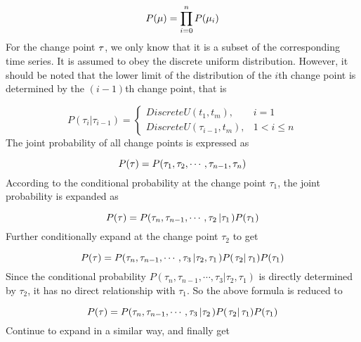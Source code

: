 \documentclass{svjour3}                     %
\begin{document}
\begin{equation}\label{eq_bayesian_prior_mu_sum}
P({\bf{\mu }}) = \prod\limits_{i = 0}^n {P({\mu _i})}
\end{equation}
For the change point ${\bf{\tau }}$, we only know that it is a subset of the corresponding time series.
It is assumed to obey the discrete uniform distribution. However, it should be noted that the lower limit of the distribution of the $i$th change point is determined by the $(i-1)$th change point, that is

\begin{equation}\label{eq_bayesian_prior_tau_basic}
P({\tau _i}\left| {{\tau _{i - 1}}} \right.) = \left\{ {\begin{array}{*{20}{r}}
	{DiscreteU({t_1},{t_m}),}&{i = 1}\\
	{DiscreteU({\tau _{i - 1}},{t_m}),}&{1 < i \le n}
	\end{array}} \right.
\end{equation}
The joint probability of all change points is expressed as

\begin{equation}\label{eq_bayesian_prior_tau_1}
P({\bf{\tau }}) = P({\tau _1},{\tau _2}, \cdots ,{\tau _{n - 1}},{\tau _n})
\end{equation}
According to the conditional probability at the change point ${\tau _1}$, the joint probability is expanded as

\begin{equation}\label{eq_bayesian_prior_tau_2}
P({\bf{\tau }}) = P({\tau _n},{\tau _{n - 1}}, \cdots ,{\tau _2}\left| {{\tau _1}} \right.)P({\tau _1})
\end{equation}
Further conditionally expand at the change point ${\tau _2}$ to get

\begin{equation}\label{eq_bayesian_prior_tau_3}
P({\bf{\tau }}) = P({\tau _n},{\tau _{n - 1}}, \cdots ,{\tau _3}\left| {{\tau _2},{\tau _1}} \right.)P(\left. {{\tau _2}} \right|{\tau _1})P({\tau _1})
\end{equation}
Since the conditional probability $P({\tau _n},{\tau _{n - 1}}, \cdots ,{\tau _3}\left| {{\tau _2},{\tau _1}} \right.)$ is directly determined by ${\tau _2}$, it has no direct relationship with ${\tau _1}$. So the above formula is reduced to

\begin{equation}\label{eq_bayesian_prior_tau_4}
P({\bf{\tau }}) = P({\tau _n},{\tau _{n - 1}}, \cdots ,{\tau _3}\left| {{\tau _2}} \right.)P(\left. {{\tau _2}} \right|{\tau _1})P({\tau _1})
\end{equation}
Continue to expand in a similar way, and finally get
\end{document}

